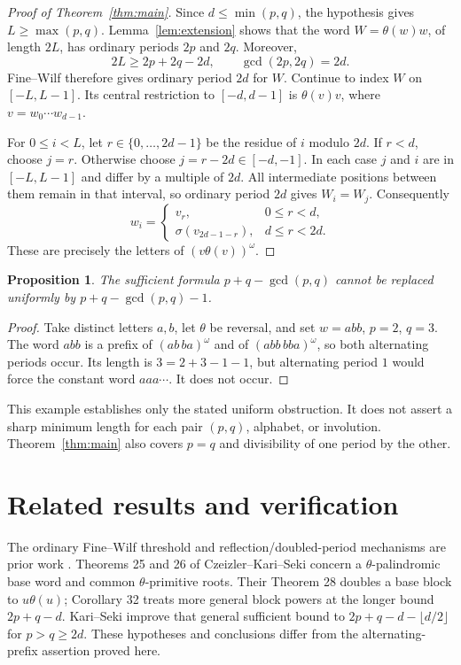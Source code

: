 \documentclass[10pt]{article}
\newtheorem{proposition}{Proposition}
\begin{document}
\begin{proof}[Proof of Theorem~\ref{thm:main}]
Since $d\le\min(p,q)$, the hypothesis gives $L\ge\max(p,q)$.
Lemma~\ref{lem:extension} shows that the word $W=\theta(w)w$, of
length $2L$, has ordinary periods $2p$ and $2q$. Moreover,
\[
 2L\ge 2p+2q-2d,\qquad \gcd(2p,2q)=2d.
\]
Fine--Wilf therefore gives ordinary period $2d$ for $W$.
Continue to index $W$ on $[-L,L-1]$. Its central restriction to
$[-d,d-1]$ is $\theta(v)v$, where $v=w_0\cdots w_{d-1}$.

For $0\le i<L$, let $r\in\{0,\ldots,2d-1\}$ be the residue
of $i$ modulo $2d$. If $r<d$, choose $j=r$. Otherwise choose
$j=r-2d\in[-d,-1]$. In each case $j$ and $i$ are in $[-L,L-1]$
and differ by a multiple of $2d$. All intermediate positions between
them remain in that interval, so ordinary period $2d$ gives $W_i=W_j$.
Consequently
\[
 w_i=\begin{cases}v_r,&0\le r<d,\\
       \sigma(v_{2d-1-r}),&d\le r<2d.
       \end{cases}
\]
These are precisely the letters of $(v\theta(v))^\omega$.
\end{proof}

\begin{proposition}\label{prop:sharp}
The sufficient formula $p+q-\gcd(p,q)$ cannot be replaced uniformly
by $p+q-\gcd(p,q)-1$.
\end{proposition}
\begin{proof}
Take distinct letters $a,b$, let $\theta$ be reversal, and set
$w=abb$, $p=2$, $q=3$. The word $abb$ is a prefix of
$(ab\,ba)^\omega$ and of $(abb\,bba)^\omega$, so both alternating
periods occur. Its length is $3=2+3-1-1$, but alternating period $1$
would force the constant word $aaa\cdots$. It does not occur.
\end{proof}
This example establishes only the stated uniform obstruction. It does
not assert a sharp minimum length for each pair $(p,q)$, alphabet,
or involution. Theorem~\ref{thm:main} also covers $p=q$ and divisibility
of one period by the other.

\section{Related results and verification}
The ordinary Fine--Wilf threshold and reflection/doubled-period
mechanisms are prior work \cite{FW,OWR,Bischoff}. Theorems 25 and 26
of Czeizler--Kari--Seki \cite{CKS} concern a $\theta$-palindromic
base word and common $\theta$-primitive roots. Their Theorem 28 doubles
a base block to $u\theta(u)$; Corollary 32 treats more general block
powers at the longer bound $2p+q-d$. Kari--Seki \cite{KS} improve
that general sufficient bound to $2p+q-d-\lfloor d/2\rfloor$ for
$p>q\ge2d$. These hypotheses and conclusions differ from the
alternating-prefix assertion proved here.
\end{document}
